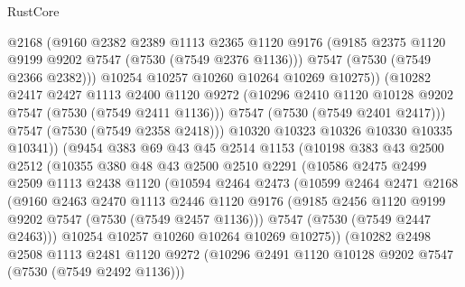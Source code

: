 \begin{lexlean}{RustCore}
\begin{coremodule}
                    @2168
                    (@9160
                      @2382
                      @2389
                      @1113
                      @2365
                      @1120
                      @9176
                      (@9185 @2375 @1120 @9199 @9202 @7547 (@7530 (@7549 @2376 @1136)))
                      @7547
                      (@7530 (@7549 @2366 @2382)))
                    @10254
                    @10257
                    @10260
                    @10264
                    @10269
                    @10275))
                (@10282
                  @2417
                  @2427
                  @1113
                  @2400
                  @1120
                  @9272
                  (@10296 @2410 @1120 @10128 @9202 @7547 (@7530 (@7549 @2411 @1136)))
                  @7547
                  (@7530 (@7549 @2401 @2417)))
                @7547
                (@7530 (@7549 @2358 @2418)))
              @10320
              @10323
              @10326
              @10330
              @10335
              @10341))
          (@9454
            @383
            @69
            @43
            @45
            @2514
            @1153
            (@10198
              @383
              @43
              @2500
              @2512
              (@10355
                @380
                @48
                @43
                @2500
                @2510
                @2291
                (@10586
                  @2475
                  @2499
                  @2509
                  @1113
                  @2438
                  @1120
                  (@10594
                    @2464
                    @2473
                    (@10599
                      @2464
                      @2471
                      @2168
                      (@9160
                        @2463
                        @2470
                        @1113
                        @2446
                        @1120
                        @9176
                        (@9185 @2456 @1120 @9199 @9202 @7547 (@7530 (@7549 @2457 @1136)))
                        @7547
                        (@7530 (@7549 @2447 @2463)))
                      @10254
                      @10257
                      @10260
                      @10264
                      @10269
                      @10275))
                  (@10282
                    @2498
                    @2508
                    @1113
                    @2481
                    @1120
                    @9272
                    (@10296 @2491 @1120 @10128 @9202 @7547 (@7530 (@7549 @2492 @1136)))

\end{coremodule}
\end{lexlean}
